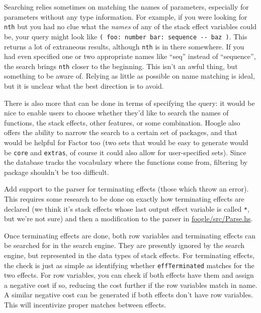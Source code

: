 \documentclass[
]{article}
\begin{document}
Searching relies sometimes on matching the names of parameters,
especially for parameters without any type information. For example, if
you were looking for \texttt{nth} but you had no clue what the
\emph{names} of any of the stack effect variables could be, your query
might look like \texttt{(\ foo:\ number\ bar:\ sequence\ -\/-\ baz\ )}.
This returns a lot of extraneous results, although \texttt{nth} is in
there somewhere. If you had even specified one or two appropriate names
like ``seq'' instead of ``sequence'', the search brings \texttt{nth}
closer to the beginning. This isn't an awful thing, but something to be
aware of. Relying as little as possible on name matching is ideal, but
it is unclear what the best direction is to avoid.

There is also more that can be done in terms of specifying the query: it
would be nice to enable users to choose whether they'd like to search
the names of functions, the stack effects, other features, or some
combination. Hoogle also offers the ability to narrow the search to a
certain set of packages, and that would be helpful for Factor too (two
sets that would be easy to generate would be \texttt{core} and
\texttt{extras}, of course it could also allow for user-specified sets).
Since the database tracks the vocabulary where the functions come from,
filtering by package shouldn't be too difficult.

Add support to the parser for terminating effects (those which throw an
error). This requires some research to be done on exactly how
terminating effects are declared (we think it's stack effects whose last
output effect variable is called \texttt{*}, but we're not sure) and
then a modification to the parser in
\href{https://github.com/factor-hmc/foogle/blob/master/src/Parse.hs}{foogle/src/Parse.hs}.

Once terminating effects are done, both row variables and terminating
effects can be searched for in the search engine. They are presently
ignored by the search engine, but represented in the data types of stack
effects. For terminating effects, the check is just as simple as
identifying whether \texttt{effTerminated} matches for the two effects.
For row variables, you can check if both effects have them and assign a
negative cost if so, reducing the cost further if the row variables
match in name. A similar negative cost can be generated if both effects
don't have row variables. This will incentivize proper matches between
effects.
\end{document}
